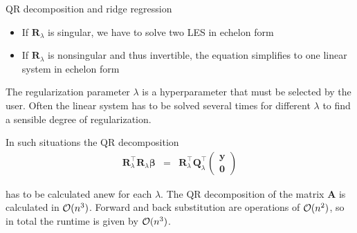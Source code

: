 \begin{vbframe}{QR decomposition and ridge regression}
\begin{itemize}
\item If $\bm{R}_\lambda$ is singular, we have to solve two LES in echelon form
\item If $\bm{R}_\lambda$ is nonsingular and thus invertible, the equation simplifies to one linear system in echelon form
\end{itemize}

\lz
The regularization parameter $\lambda$ is a hyperparameter that must be selected by the user. Often the linear system has to be solved several times for different $\lambda$ to find a sensible degree of regularization.
  
\medskip

In such situations the QR decomposition
\vspace*{-0.2cm}
\begin{eqnarray*}
\mathbf{R}_\lambda^\top\mathbf{R}_\lambda\boldsymbol{\beta} &=& \mathbf{R}_\lambda^\top\mathbf{Q}_\lambda^\top \begin{pmatrix} \mathbf{y} \\ \mathbf{0} \end{pmatrix} 
\end{eqnarray*}

has to be calculated anew for each $\lambda$. The QR decomposition of the matrix $\bm{A}$ is calculated in $\mathcal{O}(n^3)$. Forward and back substitution are operations of $\mathcal{O}(n^2)$, so in total the runtime is given by $\mathcal{O}(n^3)$.



\end{vbframe}

